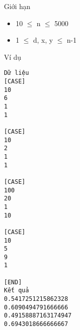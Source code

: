 Giới hạn  
\begin{itemize}
	\item     10  $\le$  n  $\le$  5000   
	\item     1  $\le$  d, x, y  $\le$  n-1   
\end{itemize}
   Ví dụ  
\begin{verbatim}
Dữ liệu
[CASE]
10
6
1
1

[CASE]
10
2
1
1

[CASE]
100
20
1
10

[CASE]
10
5
9
1

[END]
Kết quả
0.5417251215862328
0.6090494791666666
0.49158887163174947
0.6943018666666667
\end{verbatim}